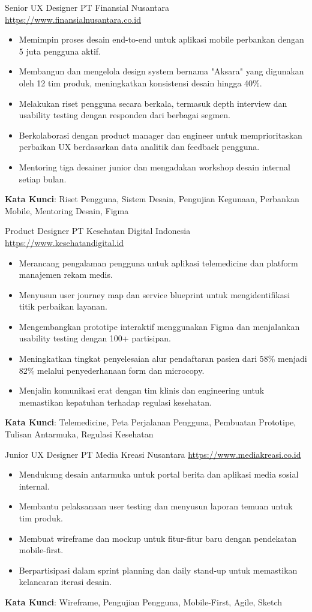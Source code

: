 \documentclass[a4paper, serif, 10pt]{moderncv}
\begin{document}
        {Senior UX Designer}
        {PT Finansial Nusantara}
        {\url{https://www.finansialnusantara.co.id}}
        {}
        {\begin{itemize}
\item Memimpin proses desain end-to-end untuk aplikasi mobile perbankan dengan 5 juta pengguna aktif.
\item Membangun dan mengelola design system bernama "Aksara" yang digunakan oleh 12 tim produk, meningkatkan konsistensi desain hingga 40\%.
\item Melakukan riset pengguna secara berkala, termasuk depth interview dan usability testing dengan responden dari berbagai segmen.
\item Berkolaborasi dengan product manager dan engineer untuk memprioritaskan perbaikan UX berdasarkan data analitik dan feedback pengguna.
\item Mentoring tiga desainer junior dan mengadakan workshop desain internal setiap bulan.
\end{itemize}
\textbf{Kata Kunci}: Riset Pengguna, Sistem Desain, Pengujian Kegunaan, Perbankan Mobile, Mentoring Desain, Figma}

        {Product Designer}
        {PT Kesehatan Digital Indonesia}
        {\url{https://www.kesehatandigital.id}}
        {}
        {\begin{itemize}
\item Merancang pengalaman pengguna untuk aplikasi telemedicine dan platform manajemen rekam medis.
\item Menyusun user journey map dan service blueprint untuk mengidentifikasi titik perbaikan layanan.
\item Mengembangkan prototipe interaktif menggunakan Figma dan menjalankan usability testing dengan 100+ partisipan.
\item Meningkatkan tingkat penyelesaian alur pendaftaran pasien dari 58\% menjadi 82\% melalui penyederhanaan form dan microcopy.
\item Menjalin komunikasi erat dengan tim klinis dan engineering untuk memastikan kepatuhan terhadap regulasi kesehatan.
\end{itemize}
\textbf{Kata Kunci}: Telemedicine, Peta Perjalanan Pengguna, Pembuatan Prototipe, Tulisan Antarmuka, Regulasi Kesehatan}

        {Junior UX Designer}
        {PT Media Kreasi Nusantara}
        {\url{https://www.mediakreasi.co.id}}
        {}
        {\begin{itemize}
\item Mendukung desain antarmuka untuk portal berita dan aplikasi media sosial internal.
\item Membantu pelaksanaan user testing dan menyusun laporan temuan untuk tim produk.
\item Membuat wireframe dan mockup untuk fitur-fitur baru dengan pendekatan mobile-first.
\item Berpartisipasi dalam sprint planning dan daily stand-up untuk memastikan kelancaran iterasi desain.
\end{itemize}
\textbf{Kata Kunci}: Wireframe, Pengujian Pengguna, Mobile-First, Agile, Sketch}
\end{document}
